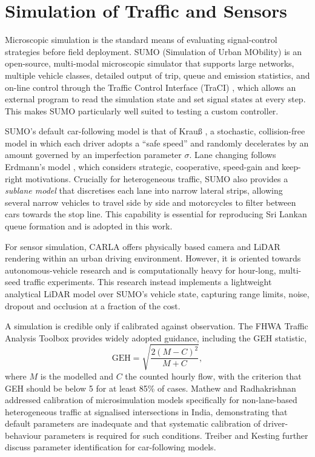 \section{Simulation of Traffic and Sensors}\label{sec:lit-sim}
Microscopic simulation is the standard means of evaluating signal-control strategies before field deployment.
SUMO (Simulation of Urban MObility) \cite{lopez2018sumo} is an open-source, multi-modal microscopic simulator that
supports large networks, multiple vehicle classes, detailed output of trip, queue and emission statistics, and
on-line control through the Traffic Control Interface (TraCI) \cite{wegener2008traci}, which allows an external
program to read the simulation state and set signal states at every step. This makes SUMO particularly well
suited to testing a custom controller.

SUMO's default car-following model is that of Krau{\ss} \cite{krauss1998}, a stochastic, collision-free model in
which each driver adopts a ``safe speed'' and randomly decelerates by an amount governed by an imperfection
parameter $\sigma$. Lane changing follows Erdmann's model \cite{erdmann2015lanechange}, which considers strategic,
cooperative, speed-gain and keep-right motivations. Crucially for heterogeneous traffic, SUMO also provides a
\emph{sublane model} \cite{sumo_sublane} that discretises each lane into narrow lateral strips, allowing several
narrow vehicles to travel side by side and motorcycles to filter between cars towards the stop line. This
capability is essential for reproducing Sri Lankan queue formation and is adopted in this work.

For sensor simulation, CARLA \cite{dosovitskiy2017carla} offers physically based camera and LiDAR rendering
within an urban driving environment. However, it is oriented towards autonomous-vehicle research and is
computationally heavy for hour-long, multi-seed traffic experiments. This research instead implements a
lightweight analytical LiDAR model over SUMO's vehicle state, capturing range limits, noise, dropout and
occlusion at a fraction of the cost.

A simulation is credible only if calibrated against observation. The FHWA Traffic Analysis Toolbox
\cite{dowling2004toolbox} provides widely adopted guidance, including the GEH statistic,
\begin{equation}
  \mathrm{GEH} = \sqrt{\frac{2(M-C)^2}{M+C}},
  \label{eq:geh}
\end{equation}
where $M$ is the modelled and $C$ the counted hourly flow, with the criterion that GEH should be below 5 for at
least 85\% of cases. Mathew and Radhakrishnan \cite{mathew2010calibration} addressed calibration of
microsimulation models specifically for non-lane-based heterogeneous traffic at signalised intersections in India,
demonstrating that default parameters are inadequate and that systematic calibration of driver-behaviour
parameters is required for such conditions. Treiber and Kesting \cite{treiber2013} further discuss
parameter identification for car-following models.

